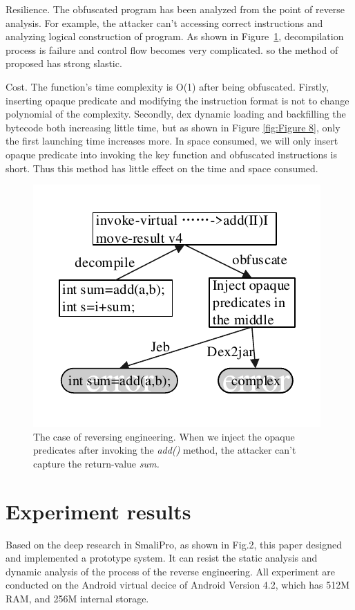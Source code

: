 Resilience. The obfuscated program has been analyzed from the point of reverse analysis. For example, the attacker can't accessing correct instructions and analyzing logical construction of program. As shown in Figure~\ref{fig:Figure 7}, decompilation process is failure and control flow becomes very complicated. so the method of proposed has strong slastic.

Cost. The function's time complexity is O(1) after being obfuscated. Firstly, inserting opaque predicate and modifying the instruction format is not to change polynomial of the complexity. Secondly, dex dynamic loading and backfilling the bytecode both increasing little time, but as shown in Figure \ref{fig:Figure 8}, only the first launching time increases more. In space consumed, we will only insert opaque predicate into invoking the key function and obfuscated instructions is short. Thus this method has little effect on the time and space consumed.


\begin{figure}[!tbp]
  \centering
  \includegraphics[width=0.8\columnwidth]{fig/fig7.pdf}
  \caption{The case of reversing engineering. When we inject the opaque predicates after invoking the \emph{add()} method, the attacker can't capture the return-value \emph{sum.}}\label{fig:Figure 7}
\end{figure}
\section{Experiment results}
Based on the deep research in SmaliPro, as shown in Fig.2, this paper designed and implemented a prototype system. It can resist the static analysis and dynamic analysis of the process of the reverse engineering. All experiment are conducted on the Android virtual decice of Android Version 4.2, which has 512M RAM, and 256M internal storage.

